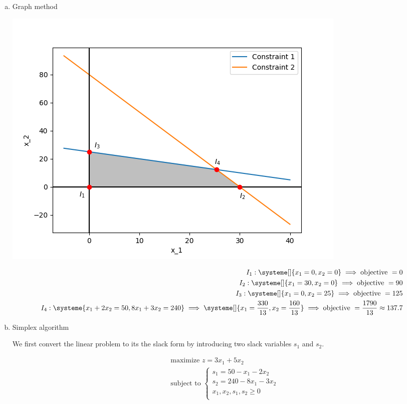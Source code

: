 \documentclass[a4paper, 10pt, twoside]{article}
\begin{document}
\begin{enumerate}[a)]
    \item Graph method
    \begin{center}
        \includegraphics[width = .5 \textwidth]{graph3.png}
    \end{center}

          \begin{align*}
              I_1 :
              \systeme[]{
                  x_1 = 0,
                  x_2 = 0
              }
              \implies \text{objective } = 0                             \\
              I_2 :
              \systeme[]{
                  x_1 = 30,
                  x_2 = 0
              }
              \implies \text{objective } = 90                            \\
              I_3 :
              \systeme[]{
                  x_1 = 0,
                  x_2 = 25
              }
              \implies \text{objective } = 125                           \\
              I_4 :
              \systeme{
                  x_1+2x_2=50,
                  8x_1+3x_2=240
              }
              \implies
              \systeme[]{
                  x_1 = \frac{330}{13},
                  x_2 = \frac{160}{13}
              }
              \implies \text{objective } = \frac{1790}{13} \approx 137.7 \\
          \end{align*}

    \item Simplex algorithm

          We first convert the linear problem to its the slack form by introducing two slack variables $s_1$ and $s_2$.

          \begin{align*}
               & \text{maximize } z = 3x_1 + 5x_2 \\
               & \text{subject to }
              \begin{cases}
                  s_1 = 50 - x_1 - 2x_2    \\
                  s_2 = 240 - 8x_1 - 3x_2  \\
                  x_1, x_2, s_1, s_2 \ge 0 \\
              \end{cases}
          \end{align*}


\end{enumerate}
\end{document}
